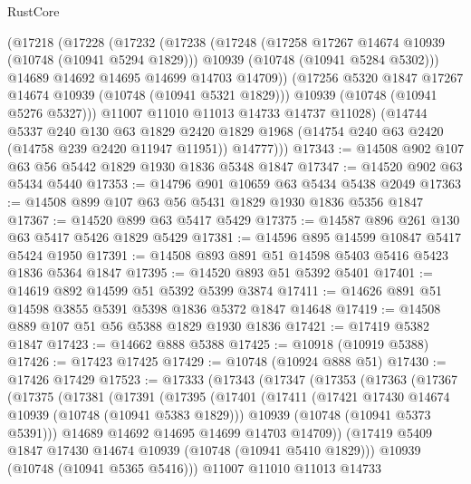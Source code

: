 \begin{lexlean}{RustCore}
\begin{coremodule}
        (@17218
          (@17228
            (@17232
              (@17238
                (@17248
                  (@17258 @17267 @14674 @10939 (@10748 (@10941 @5294 @1829)))
                  @10939
                  (@10748 (@10941 @5284 @5302)))
                @14689
                @14692
                @14695
                @14699
                @14703
                @14709))
            (@17256 @5320 @1847 @17267 @14674 @10939 (@10748 (@10941 @5321 @1829)))
            @10939
            (@10748 (@10941 @5276 @5327)))
          @11007
          @11010
          @11013
          @14733
          @14737
          @11028)
        (@14744
          @5337
          @240
          @130
          @63
          @1829
          @2420
          @1829
          @1968
          (@14754 @240 @63 @2420 (@14758 @239 @2420 @11947 @11951))
          @14777)))
@17343 := @14508 @902 @107 @63 @56 @5442 @1829 @1930 @1836 @5348 @1847
@17347 := @14520 @902 @63 @5434 @5440
@17353 := @14796 @901 @10659 @63 @5434 @5438 @2049
@17363 := @14508 @899 @107 @63 @56 @5431 @1829 @1930 @1836 @5356 @1847
@17367 := @14520 @899 @63 @5417 @5429
@17375 := @14587 @896 @261 @130 @63 @5417 @5426 @1829 @5429
@17381 := @14596 @895 @14599 @10847 @5417 @5424 @1950
@17391 := @14508 @893 @891 @51 @14598 @5403 @5416 @5423 @1836 @5364 @1847
@17395 := @14520 @893 @51 @5392 @5401
@17401 := @14619 @892 @14599 @51 @5392 @5399 @3874
@17411 := @14626 @891 @51 @14598 @3855 @5391 @5398 @1836 @5372 @1847 @14648
@17419 := @14508 @889 @107 @51 @56 @5388 @1829 @1930 @1836
@17421 := @17419 @5382 @1847
@17423 := @14662 @888 @5388
@17425 := @10918 (@10919 @5388)
@17426 := @17423 @17425
@17429 := @10748 (@10924 @888 @51)
@17430 := @17426 @17429
@17523 := @17333
    (@17343
      (@17347
        (@17353
          (@17363
            (@17367
              (@17375
                (@17381
                  (@17391
                    (@17395
                      (@17401
                        (@17411
                          (@17421 @17430 @14674 @10939 (@10748 (@10941 @5383 @1829)))
                          @10939
                          (@10748 (@10941 @5373 @5391)))
                        @14689
                        @14692
                        @14695
                        @14699
                        @14703
                        @14709))
                    (@17419 @5409 @1847 @17430 @14674 @10939 (@10748 (@10941 @5410 @1829)))
                    @10939
                    (@10748 (@10941 @5365 @5416)))
                  @11007
                  @11010
                  @11013
                  @14733

\end{coremodule}
\end{lexlean}
